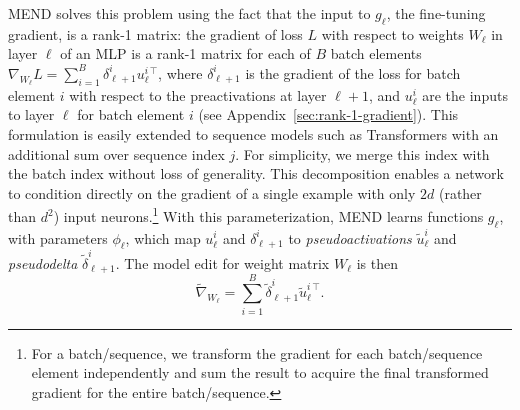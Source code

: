 \documentclass{article}
\newcommand{\name}{MEND}
\begin{document}
{\name} solves this problem using the fact that the input to $g_\ell$, the fine-tuning gradient, is a rank-1 matrix: the gradient of loss $L$ with respect to weights $W_{\ell}$ in layer $\ell$ of an MLP is a rank-1 matrix for each of $B$ batch elements $\nabla_{W_\ell}L = \sum_{i=1}^B\delta_{\ell + 1}^i{u_\ell^{i\,\top}}$, where $\delta_{\ell+1}^i$ is the gradient of the loss for batch element $i$ with respect to the preactivations at layer $\ell+1$, and $u_\ell^i$ are the inputs to layer $\ell$ for batch element $i$ (see Appendix~\ref{sec:rank-1-gradient}). This formulation is easily extended to sequence models such as Transformers \citep{vaswani2017attention,radford2019language} with an additional sum over sequence index $j$. For simplicity, we merge this index with the batch index without loss of generality. This decomposition enables a network to condition directly on the gradient of a single example with only $2d$ (rather than $d^2$) input neurons.\footnote{For a batch/sequence, we transform the gradient for each batch/sequence element independently and sum the result to acquire the final transformed gradient for the entire batch/sequence.} With this parameterization, {\name} learns functions $g_\ell$, with parameters $\phi_\ell$, which map $u_\ell^i$ and $\delta_{\ell+1}^i$ to \textit{pseudoactivations} $\tilde u_\ell^i$ and \textit{pseudodelta} $\tilde\delta_{\ell+1}^i$. The model edit for weight matrix $W_\ell$ is then 
\vspace{-1mm}
\begin{equation}
    \label{eq:pseudogradient}
    \textstyle \tilde{\nabla}_{W_\ell} = \sum_{i=1}^B\tilde\delta_{\ell + 1}^{i}{\tilde u_\ell^{i\,\top}}.
\end{equation}
\vspace{-5.5mm}
\end{document}
